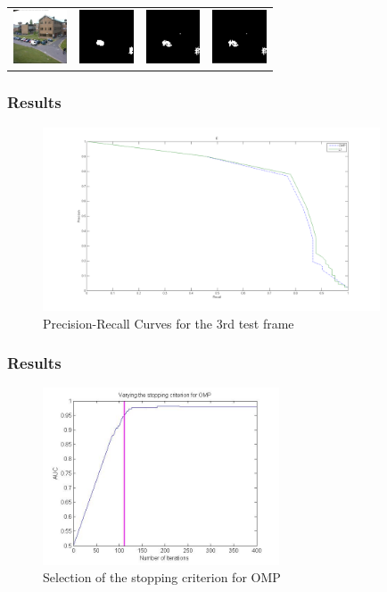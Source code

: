 \documentclass[xcolor=dvipsnames,10pt]{beamer}
\begin{document}
\begin{frame}
\begin{table}[ht!]
\begin{tabular}{cccc}
 \includegraphics[width=16mm]{3}& \includegraphics[width=16mm]{GTE} & \includegraphics[width=16mm]{3l} & \includegraphics[width=16mm]{3o} \\
 \end{tabular}
\label{tab:gt}
\end{table}

\end{frame}

\begin{frame}
  \frametitle{Results}
  \begin{figure}[t]
  \centering
  \includegraphics[width = 10cm]{Epr}
  \caption{Precision-Recall Curves for the 3rd test frame}
  \label{fig:precrec}
\end{figure}
\end{frame}
      
\begin{frame}
  \frametitle{Results}
  
\begin{figure}[t]
  \centering
  \includegraphics[width = 7cm]{varyingSComp}
  \caption{Selection of the stopping criterion for OMP}
  \label{fig:omp}
\end{figure}
\end{frame}
\end{document}
